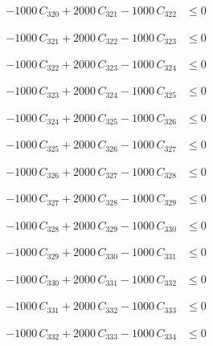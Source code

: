 \documentclass[a4paper,11pt]{article}
\begin{document}
\begin{align}
-1000\,C_{320} + 2000\,C_{321} - 1000\,C_{322} &\leq 0 \nonumber
\end{align}

\begin{align}
-1000\,C_{321} + 2000\,C_{322} - 1000\,C_{323} &\leq 0 \nonumber
\end{align}

\begin{align}
-1000\,C_{322} + 2000\,C_{323} - 1000\,C_{324} &\leq 0 \nonumber
\end{align}

\begin{align}
-1000\,C_{323} + 2000\,C_{324} - 1000\,C_{325} &\leq 0 \nonumber
\end{align}

\begin{align}
-1000\,C_{324} + 2000\,C_{325} - 1000\,C_{326} &\leq 0 \nonumber
\end{align}

\begin{align}
-1000\,C_{325} + 2000\,C_{326} - 1000\,C_{327} &\leq 0 \nonumber
\end{align}

\begin{align}
-1000\,C_{326} + 2000\,C_{327} - 1000\,C_{328} &\leq 0 \nonumber
\end{align}

\begin{align}
-1000\,C_{327} + 2000\,C_{328} - 1000\,C_{329} &\leq 0 \nonumber
\end{align}

\begin{align}
-1000\,C_{328} + 2000\,C_{329} - 1000\,C_{330} &\leq 0 \nonumber
\end{align}

\begin{align}
-1000\,C_{329} + 2000\,C_{330} - 1000\,C_{331} &\leq 0 \nonumber
\end{align}

\begin{align}
-1000\,C_{330} + 2000\,C_{331} - 1000\,C_{332} &\leq 0 \nonumber
\end{align}

\begin{align}
-1000\,C_{331} + 2000\,C_{332} - 1000\,C_{333} &\leq 0 \nonumber
\end{align}

\begin{align}
-1000\,C_{332} + 2000\,C_{333} - 1000\,C_{334} &\leq 0 \nonumber
\end{align}
\end{document}
